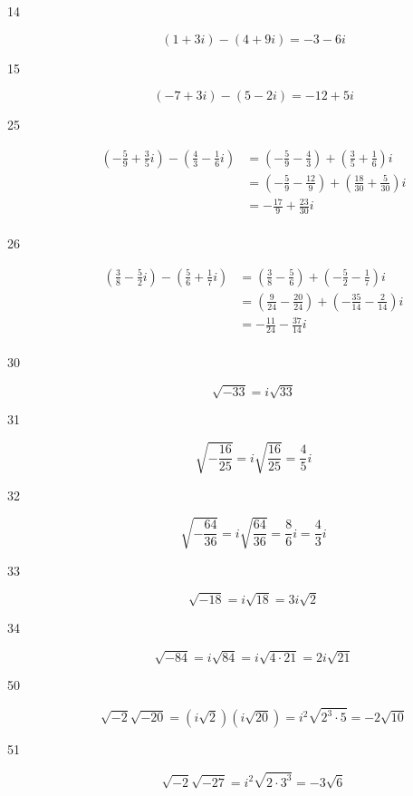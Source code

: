 \documentclass[fleqn,addpoints]{exam}
\begin{document}
\begin{description}
\item[14]
\[
  (1+3i) - (4+9i) = -3 - 6i
\]

\item[15]
\[
  (-7+3i) - (5-2i) = -12 + 5i
\]

\item[25]
\begin{align*}
  \left( - \frac{5}{9} + \frac{3}{5} i\right) - \left( \frac{4}{3} - \frac{1}{6} i \right)
    & = \left( - \frac{5}{9} - \frac{4}{3} \right) + \left( \frac{3}{5} + \frac{1}{6} \right) i \\
    & = \left( - \frac{5}{9} - \frac{12}{9} \right) + \left( \frac{18}{30} + \frac{5}{30} \right) i \\
    &= - \frac{17}{9} + \frac{23}{30} i \\
\end{align*}

\item[26]
\begin{align*}
  \left( \frac{3}{8} - \frac{5}{2} i\right) - \left( \frac{5}{6} + \frac{1}{7} i \right)
    &= \left( \frac{3}{8} - \frac{5}{6} \right) + \left( - \frac{5}{2} - \frac{1}{7} \right) i \\
    &= \left( \frac{9}{24} - \frac{20}{24} \right) + \left( - \frac{35}{14} - \frac{2}{14} \right) i \\
    &= - \frac{11}{24} - \frac{37}{14} i \\
\end{align*}

\item[30]
\[
  \sqrt{-33} = i \sqrt{33} 
\]

\item[31]
\[
  \sqrt{- \frac{16}{25}} = i \sqrt{\frac{16}{25}} = \frac{4}{5} i
\]

\item[32]
\[
  \sqrt{- \frac{64}{36}} = i \sqrt{\frac{64}{36}} = \frac{8}{6} i = \frac{4}{3} i
\]

\item[33]
\[
  \sqrt{-18} = i \sqrt{18} = 3i \sqrt{2}
\]

\item[34]
\[
  \sqrt{-84} = i \sqrt{84} = i \sqrt{4 \cdot 21} = 2i \sqrt{21}
\]

\item[50]
\[
  \sqrt{-2} \sqrt{-20} =  (i \sqrt{2}) (i \sqrt{20}) = i^2 \sqrt{2^3 \cdot 5} = -2 \sqrt{10}
\]

\item[51]
\[
  \sqrt{-2} \sqrt{-27} = i^2 \sqrt{2 \cdot 3^3} = -3 \sqrt{6}
\]


\end{description}
\end{document}

